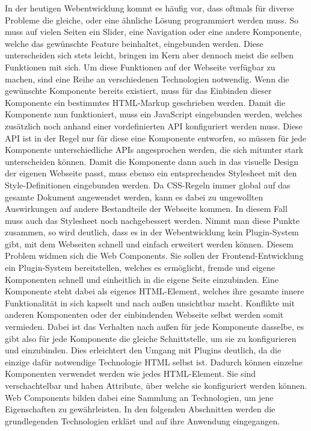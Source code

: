 In der heutigen Webentwicklung kommt es häufig vor, dass oftmals für diverse Probleme die gleiche, oder eine ähnliche Lösung programmiert werden muss. So muss auf vielen Seiten ein Slider, eine Navigation oder eine andere Komponente, welche das gewünschte Feature beinhaltet, eingebunden werden. Diese unterscheiden sich stets leicht, bringen im Kern aber dennoch meist die selben Funktionen mit sich. Um diese Funktionen auf der Webseite verfügbar zu machen, sind eine Reihe an verschiedenen Technologien notwendig. Wenn die gewünschte Komponente bereits existiert, muss für das Einbinden dieser Komponente ein bestimmtes HTML-Markup geschrieben werden. Damit die Komponente nun funktioniert, muss ein JavaScript eingebunden werden, welches zusätzlich noch anhand einer vordefinierten API konfiguriert werden muss. Diese API ist in der Regel nur für diese eine Komponente entworfen, so müssen für jede Komponente unterschiedliche APIs angesprochen werden, die sich mitunter stark unterscheiden können. Damit die Komponente dann auch in das visuelle Design der eigenen Webseite passt, muss ebenso ein entsprechendes Stylesheet mit den Style-Definitionen eingebunden werden. Da CSS-Regeln immer global auf das gesamte Dokument angewendet werden, kann es dabei zu ungewollten Auswirkungen auf andere Bestandteile der Webseite kommen. In diesem Fall muss auch das Stylesheet noch nachgebessert werden. Nimmt man diese Punkte zusammen, so wird deutlich, dass es in der Webentwicklung kein Plugin-System gibt, mit dem Webseiten schnell und einfach erweitert werden können.
Diesem Problem widmen sich die Web Components. Sie sollen der Frontend-Entwicklung ein Plugin-System bereitstellen, welches es ermöglicht, fremde und eigene Komponenten schnell und einheitlich in die eigene Seite einzubinden. Eine Komponente steht dabei als eigenes HTML-Element, welches ihre gesamte innere Funktionalität in sich kapselt und nach außen unsichtbar macht. Konflikte mit anderen Komponenten oder der einbindenden Webseite selbst werden somit vermieden. Dabei ist das Verhalten nach außen für jede Komponente dasselbe, es gibt also für jede Komponente die gleiche Schnittstelle, um sie zu konfigurieren und einzubinden. Dies erleichtert den Umgang mit Plugins deutlich, da die einzige dafür notwendige Technologie HTML selbst ist. Dadurch können einzelne Komponenten verwendet werden wie jedes HTML-Element. Sie sind verschachtelbar und haben Attribute, über welche sie konfiguriert werden können. Web Components bilden dabei eine Sammlung an Technologien, um jene Eigenschaften zu gewährleisten. In den folgenden Abschnitten werden die grundlegenden Technologien erklärt und auf ihre Anwendung eingegangen.
